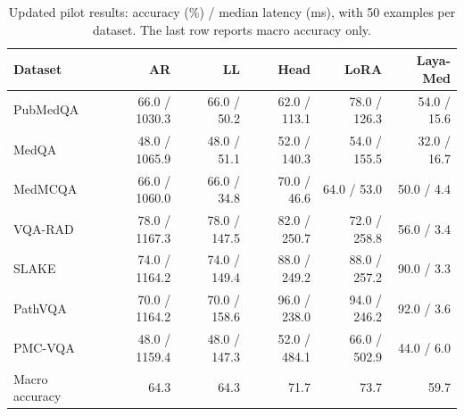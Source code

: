 \begin{table}[t]
\centering\small
\setlength{\tabcolsep}{5pt}
\begin{tabular}{lrrrrr}
\toprule
Dataset & AR & LL & Head & LoRA & Laya-Med \\
\midrule
PubMedQA & 66.0 / 1030.3 & 66.0 / 50.2 & 62.0 / 113.1 & 78.0 / 126.3 & 54.0 / 15.6 \\
MedQA & 48.0 / 1065.9 & 48.0 / 51.1 & 52.0 / 140.3 & 54.0 / 155.5 & 32.0 / 16.7 \\
MedMCQA & 66.0 / 1060.0 & 66.0 / 34.8 & 70.0 / 46.6 & 64.0 / 53.0 & 50.0 / 4.4 \\
VQA-RAD & 78.0 / 1167.3 & 78.0 / 147.5 & 82.0 / 250.7 & 72.0 / 258.8 & 56.0 / 3.4 \\
SLAKE & 74.0 / 1164.2 & 74.0 / 149.4 & 88.0 / 249.2 & 88.0 / 257.2 & 90.0 / 3.3 \\
PathVQA & 70.0 / 1164.2 & 70.0 / 158.6 & 96.0 / 238.0 & 94.0 / 246.2 & 92.0 / 3.6 \\
PMC-VQA & 48.0 / 1159.4 & 48.0 / 147.3 & 52.0 / 484.1 & 66.0 / 502.9 & 44.0 / 6.0 \\
\midrule
Macro accuracy & 64.3 & 64.3 & 71.7 & 73.7 & 59.7 \\
\bottomrule
\end{tabular}
\caption{Updated pilot results: accuracy (\%) / median latency (ms), with 50 examples per dataset. The last row reports macro accuracy only.}
\label{tab:sysone-landscape}
\end{table}
